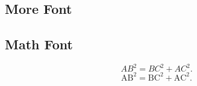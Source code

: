\documentclass{article}
\begin{document}
        \subsection{More Font}

        \subsection{Math Font}

            \begin{equation}
                AB^2 = BC^2 + AC^2. 
            \end{equation}
            \begin{equation}
                \mathrm{AB^2 = BC^2 + AC^2. }
            \end{equation}
\end{document}

